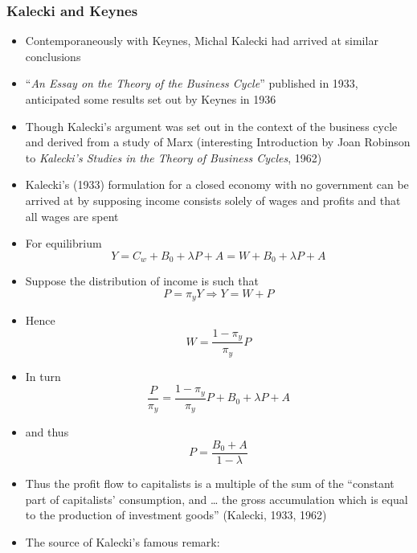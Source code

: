 \documentclass{article}
\begin{document}
\subsubsection{Kalecki and Keynes}
	\begin{itemize}
		\item Contemporaneously with Keynes, Michal Kalecki had arrived at similar conclusions
		\item ``\textit{An Essay on the Theory of the Business Cycle}'' published in 1933, anticipated some results set out by Keynes in 1936
		\item Though Kalecki's argument was set out in the context of the business cycle and derived from a study of Marx (interesting Introduction by Joan Robinson to \textit{Kalecki's Studies in the Theory of Business Cycles}, 1962)
		\item Kalecki's (1933) formulation for a closed economy with no government can be arrived at by supposing income consists solely of wages and profits and that all wages are spent
		\item For equilibrium
		\begin{equation}
			Y = C_w + B_0 + \lambda P + A = W + B_0 + \lambda P + A \label{E:4.1}
		\end{equation}
		\item Suppose the distribution of income is such that
		\begin{equation}
			P = \pi_y Y \Rightarrow Y = W + P \label{E:4.2}
		\end{equation}
		\item Hence
		\begin{equation}
			W = \frac{1-\pi_y}{\pi_y} P \label{E:4.3}
		\end{equation}
		\item In turn
		\begin{equation}
			\frac{P}{\pi_y} = \frac{1-\pi_y}{\pi_y}P+B_0+ \lambda P + A \label{E:4.4}
		\end{equation}
		\item and thus
		\begin{equation}
			P = \frac{B_0+A}{1-\lambda} \label{E:4.5}
		\end{equation}
		\item Thus the profit flow to capitalists is a multiple of the sum of the ``constant part of capitalists' consumption, and \dots\: the gross accumulation which is equal to the production of investment goods'' (Kalecki, 1933, 1962)
		\item The source of Kalecki's famous remark:

\end{itemize}
\end{document}
